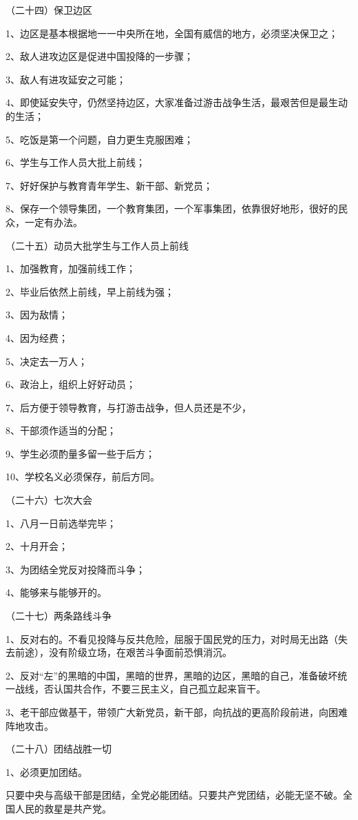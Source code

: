 （二十四）保卫边区

1、边区是基本根据地一一中央所在地，全国有威信的地方，必须坚决保卫之；

2、敌人进攻边区是促进中国投降的一步骤；

3、敌人有进攻延安之可能；

4、即使延安失守，仍然坚持边区，大家准备过游击战争生活，最艰苦但是最生动的生活；

5、吃饭是第一个问题，自力更生克服困难；

6、学生与工作人员大批上前线；

7、好好保护与教育青年学生、新干部、新党员；

8、保存一个领导集团，一个教育集团，一个军事集团，依靠很好地形，很好的民众，一定有办法。

（二十五）动员大批学生与工作人员上前线

1、加强教育，加强前线工作；

2、毕业后依然上前线，早上前线为强；

3、因为敌情；

4、因为经费；

5、决定去一万人；

6、政治上，组织上好好动员；

7、后方便于领导教育，与打游击战争，但人员还是不少，

8、干部须作适当的分配；

9、学生必须酌量多留一些于后方；

10、学校名义必须保存，前后方同。

（二十六）七次大会

1、八月一日前选举完毕；

2、十月开会；

3、为团结全党反对投降而斗争；

4、能够来与能够开的。

（二十七）两条路线斗争

1、反对右的。不看见投降与反共危险，屈服于国民党的压力，对时局无出路（失去前途），没有阶级立场，在艰苦斗争面前恐惧消沉。

2、反对“左”的黑暗的中国，黑暗的世界，黑暗的边区，黑暗的自己，准备破坏统一战线，否认国共合作，不要三民主义，自己孤立起来盲干。

3、老干部应做基干，带领广大新党员，新干部，向抗战的更高阶段前进，向困难阵地攻击。

（二十八）团结战胜一切

1、必须更加团结。

只要中央与高级干部是团结，全党必能团结。只要共产党团结，必能无坚不破。全国人民的救星是共产党。

